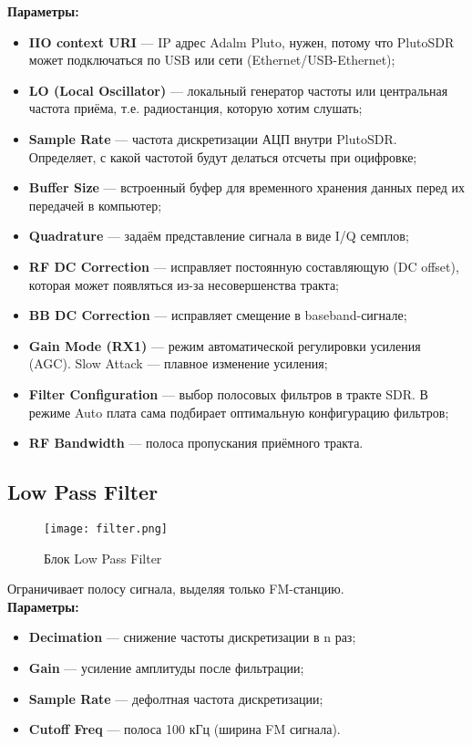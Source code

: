\textbf{Параметры:}

\begin{itemize}
    \item \textbf{IIO context URI} — IP адрес Adalm Pluto, нужен, потому что PlutoSDR может подключаться по USB или сети (Ethernet/USB-Ethernet);
    \item \textbf{LO (Local Oscillator)} — локальный генератор частоты или центральная частота приёма, т.е. радиостанция, которую хотим слушать;
    \item \textbf{Sample Rate} — частота дискретизации АЦП внутри PlutoSDR. Определяет, с какой частотой будут делаться отсчеты при оцифровке;
    \item \textbf{Buffer Size} — встроенный буфер для временного хранения данных перед их передачей в компьютер;
    \item \textbf{Quadrature} — задаём представление сигнала в виде I/Q семплов;
    \item \textbf{RF DC Correction} — исправляет постоянную составляющую (DC offset), которая может появляться из-за несовершенства тракта;
    \item \textbf{BB DC Correction} — исправляет смещение в baseband-сигнале;
    \item \textbf{Gain Mode (RX1)} — режим автоматической регулировки усиления (AGC). Slow Attack — плавное изменение усиления;
    \item \textbf{Filter Configuration} — выбор полосовых фильтров в тракте SDR. В режиме Auto плата сама подбирает оптимальную конфигурацию фильтров;
    \item \textbf{RF Bandwidth} — полоса пропускания приёмного тракта.
\end{itemize}

\subsection*{\textbf{Low Pass Filter}}

\begin{figure}[H]
    \centering
    \texttt{[image: filter.png]}
    \caption{Блок Low Pass Filter}
\end{figure}

Ограничивает полосу сигнала, выделяя только FM-станцию. \\

\textbf{Параметры:}

\begin{itemize}
    \item \textbf{Decimation} — снижение частоты дискретизации в n раз;
    \item \textbf{Gain} — усиление амплитуды после фильтрации;
    \item \textbf{Sample Rate} — дефолтная частота дискретизации;
    \item \textbf{Cutoff Freq} — полоса 100 кГц (ширина FM сигнала).
\end{itemize}

